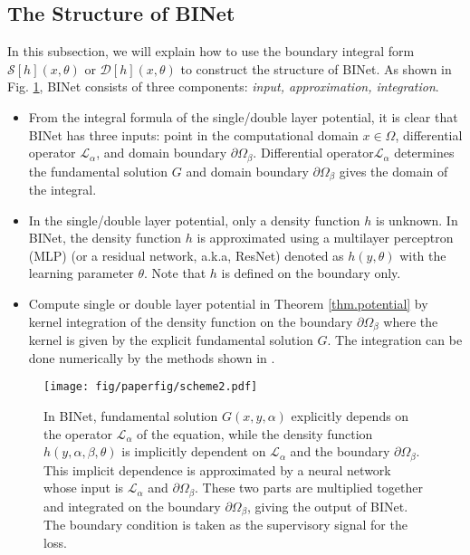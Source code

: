 \documentclass[hyperref]{article}
\numberwithin{equation}{section}
\theoremstyle{nonumberplain}
\begin{document}
	
	
	
	
	\subsection{The Structure of BINet}
	In this subsection, we will explain how to use the boundary integral form $\mathcal{S}[h](x, \theta)$ or $\mathcal{D}[h](x, \theta)$ to construct the structure of BINet. %
	As shown in Fig. \ref{fig.sd}, BINet consists of three components: \emph{input, approximation, integration}.
	\begin{itemize}%
		\item From the integral formula of the single/double layer potential, it is clear that BINet has three inputs: point in the computational domain $x\in \Omega$, differential operator $\mathcal{L}_\alpha$,  and domain boundary $\partial \Omega_{\beta}$. Differential operator$\mathcal{L}_\alpha$ determines the fundamental solution $G$ and domain boundary $\partial \Omega_{\beta}$ gives the domain of the integral.    
		\item In the single/double layer potential, only a density function $h$ is unknown. In BINet, the density function $h$ is approximated using a multilayer perceptron (MLP) (or a residual network, a.k.a, ResNet) denoted as $h(y,\theta)$ with the learning parameter $\theta$. Note that $h$ is defined on the boundary only. 
		\item Compute single or double layer potential in Theorem \ref{thm.potential} by kernel integration of the density function on the boundary $\partial\Omega_{\beta}$ where the kernel is given by the explicit fundamental solution $G$. The integration can be done numerically by the methods shown in \cite{alpert1999hybrid, kapur1997high}.
	\end{itemize}
	
	\begin{figure}[t]
		\centering
		\texttt{[image: fig/paperfig/scheme2.pdf]}
		\caption{In BINet, fundamental solution $G(x,y,\alpha)$ explicitly depends on the operator $\mathcal{L}_\alpha$ of the equation, while the density function $h(y,\alpha,\beta,\theta)$ is implicitly dependent on $\mathcal{L}_\alpha$ and the boundary $\partial\Omega_\beta$. This implicit dependence is approximated by a neural network whose input is $\mathcal{L}_\alpha$ and $\partial \Omega_\beta$. These two parts are multiplied together and integrated on the boundary $\partial\Omega_\beta$, giving the output of BINet. The boundary condition is taken as the supervisory signal for the loss.
		}
		
		\label{fig.sd}
	\end{figure}    
	
\end{document}
